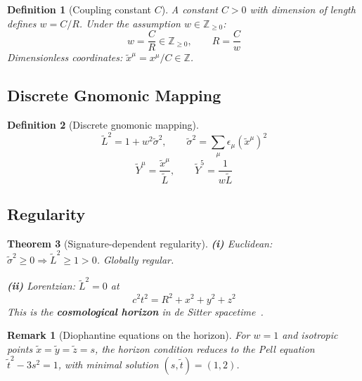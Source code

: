 \documentclass[12pt,a4paper]{article}
\newtheorem{theorem}{Theorem}[section]
\newtheorem{definition}[theorem]{Definition}
\newtheorem*{remark}{Remark}
\begin{document}
\begin{definition}[Coupling constant $C$]\label{def:C}
A constant $C > 0$ with dimension of length defines $w = C/R$. Under the assumption $w \in \mathbb{Z}_{\geq 0}$:
\begin{equation}
w = \frac{C}{R} \in \mathbb{Z}_{\geq 0}, \qquad R = \frac{C}{w} \tag{6.1}
\end{equation}
Dimensionless coordinates: $\tilde{x}^\mu = x^\mu / C \in \mathbb{Z}$.
\end{definition}

\subsection{Discrete Gnomonic Mapping}

\begin{definition}[Discrete gnomonic mapping]\label{def:discrete}
\begin{equation}
\tilde{L}^2 = 1 + w^2 \tilde{\sigma}^2, \qquad \tilde{\sigma}^2 = \sum_\mu \epsilon_\mu (\tilde{x}^\mu)^2 \tag{6.2}
\end{equation}
\begin{equation}
\tilde{Y}^\mu = \frac{\tilde{x}^\mu}{\tilde{L}}, \qquad \tilde{Y}^5 = \frac{1}{w\tilde{L}} \tag{6.3}
\end{equation}
\end{definition}

\subsection{Regularity}

\begin{theorem}[Signature-dependent regularity]\label{thm:reg}
\textbf{(i)} Euclidean: $\tilde{\sigma}^2 \geq 0 \Rightarrow \tilde{L}^2 \geq 1 > 0$. Globally regular.

\textbf{(ii)} Lorentzian: $\tilde{L}^2 = 0$ at
\begin{equation}
c^2t^2 = R^2 + x^2 + y^2 + z^2 \tag{6.6}
\end{equation}
This is the \textbf{cosmological horizon} in de Sitter spacetime~\cite{Guo2004}.
\end{theorem}

\begin{remark}[Diophantine equations on the horizon]
For $w = 1$ and isotropic points $\tilde{x} = \tilde{y} = \tilde{z} = s$, the horizon condition reduces to the Pell equation $\tilde{t}^2 - 3s^2 = 1$, with minimal solution $(s, \tilde{t}) = (1, 2)$.
\end{remark}
\end{document}
